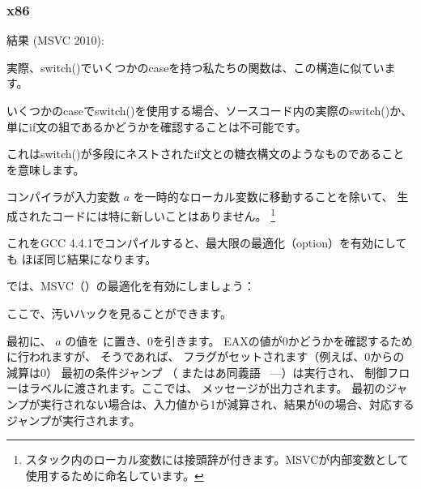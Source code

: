 ﻿\subsubsection{x86}


結果 (MSVC 2010):



実際、switch()でいくつかのcaseを持つ私たちの関数は、この構造に似ています。




いくつかのcaseでswitch()を使用する場合、ソースコード内の実際のswitch()か、
単にif文の組であるかどうかを確認することは不可能です。
\myindex{\SyntacticSugar}

これはswitch()が多段にネストされたif文との糖衣構文のようなものであることを意味します。

コンパイラが入力変数 $a$ を一時的なローカル変数に移動することを除いて、
生成されたコードには特に新しいことはありません。
\footnote{スタック内のローカル変数には接頭辞が付きます。MSVCが内部変数として使用するために命名しています。}

これをGCC 4.4.1でコンパイルすると、最大限の最適化（\Othree option）を有効にしても
ほぼ同じ結果になります。


では、MSVC（\Ox）の最適化を有効にしましょう：

\label{JMP_instead_of_RET}


ここで、汚いハックを見ることができます。


最初に、 $a$ の値を \EAX に置き、0を引きます。 EAXの値が0かどうかを確認するために行われますが、
そうであれば、 \ZF フラグがセットされます（例えば、0からの減算は0）
最初の条件ジャンプ \JE （ またはあ同義語 \JZ~---）は実行され、
制御フローはラベルに渡されます。ここでは、 メッセージが出力されます。
最初のジャンプが実行されない場合は、入力値から1が減算され、結果が0の場合、対応するジャンプが実行されます。

